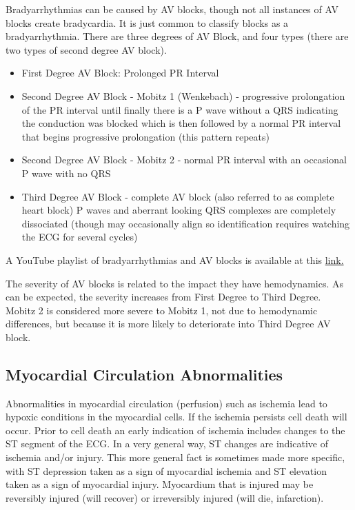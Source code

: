 Bradyarrhythmias can be caused by AV blocks, though not all instances of AV blocks create bradycardia. It is just common to classify blocks as a bradyarrhythmia. There are three degrees of AV Block, and four types (there are two types of second degree AV block).

\begin{itemize}
    \item First Degree AV Block: Prolonged PR Interval
    \item Second Degree AV Block - Mobitz 1 (Wenkebach) - progressive prolongation of the PR interval until finally there is a P wave without a QRS indicating the conduction was blocked which is then followed by a normal PR interval that begins progressive prolongation (this pattern repeats)
    \item Second Degree AV Block - Mobitz 2 - normal PR interval with an occasional P wave with no QRS
    \item Third Degree AV Block - complete AV block (also referred to as complete heart block) P waves and aberrant looking QRS complexes are completely dissociated (though may occasionally align so identification requires watching the ECG for several cycles)
\end{itemize}

A YouTube playlist of bradyarrhythmias and AV blocks is available at this \href{https://www.youtube.com/playlist?list=PLNN6HI4OXQmyt5Ql2um3MthEtLkdJnywd}{link.}

The severity of AV blocks is related to the impact they have hemodynamics. As can be expected, the severity increases from First Degree to Third Degree. Mobitz 2 is considered more severe to Mobitz 1, not due to hemodynamic differences, but because it is more likely to deteriorate into Third Degree AV block.

\subsection{Myocardial Circulation Abnormalities}

Abnormalities in myocardial circulation (perfusion) such as ischemia lead to hypoxic conditions in the myocardial cells. If the ischemia persists cell death will occur. Prior to cell death an early indication of ischemia includes changes to the ST segment of the ECG. In a very general way, ST changes are indicative of ischemia and/or injury. This more general fact is sometimes made more specific, with ST depression taken as a sign of myocardial ischemia and ST elevation taken as a sign of myocardial injury. Myocardium that is injured may be reversibly injured (will recover) or irreversibly injured (will die, infarction). 

